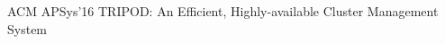 \cvpub
{ACM APSys'16} %
{TRIPOD: An Efficient, Highly-available Cluster Management System} %
{} %
{} %
{ %
}
